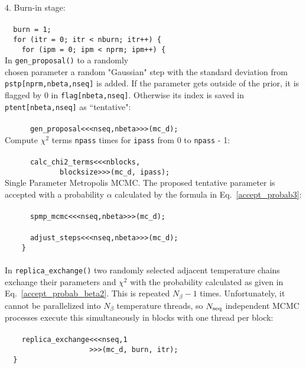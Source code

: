 \documentclass[preprint2]{aastex}
\begin{document}
4. Burn-in stage: \\\\
\verb|  burn = 1;| \\
\verb|  for (itr = 0; itr < nburn; itr++) {| \\
\verb|    for (ipm = 0; ipm < nprm; ipm++) {| \\

In \verb|gen_proposal()| to a randomly \\
chosen parameter a random "Gaussian" step with the standard deviation from 
\verb|pstp[nprm,nbeta,nseq]| is added. If the parameter gets outside of the prior, it is flagged by 0 in 
\verb|flag[nbeta,nseq]|. Otherwise its index is 
saved in
\verb|ptent[nbeta,nseq]| as ``tentative": \\ \\
\verb|      gen_proposal<<<nseq,nbeta>>>(mc_d);| \\

Compute $\chi^2$ terms \verb|npass| times for \verb|ipass| from 0 to \verb|npass| - 1: \\ \\
\verb|      calc_chi2_terms<<<nblocks,| \\
\verb|             blocksize>>>(mc_d, ipass);| \\

Single Parameter Metropolis MCMC. The proposed tentative parameter is accepted with a probability $\alpha$ calculated by the formula in Eq.~\eqref{accept_probab3}: \\ \\
\verb|      spmp_mcmc<<<nseq,nbeta>>>(mc_d);| \\ \\
\verb|      adjust_steps<<<nseq,nbeta>>>(mc_d);|  \\
\verb|    }| \\ \\
In \verb|replica_exchange()| two randomly selected adjacent temperature chains exchange their parameters and $\chi^2$ with the probability calculated as given in Eq.~\eqref{accept_probab_beta2}. This is repeated
$N_\beta-1$ times. Unfortunately, it cannot be parallelized into $N_\beta$ temperature threads, so $N_{\rm seq}$ independent MCMC processes execute this simultaneously in blocks with one thread per block: \\ \\ 
\verb|    replica_exchange<<<nseq,1| \\
\verb|                    >>>(mc_d, burn, itr);| \\
\verb|  }| \\ \\
\end{document}
